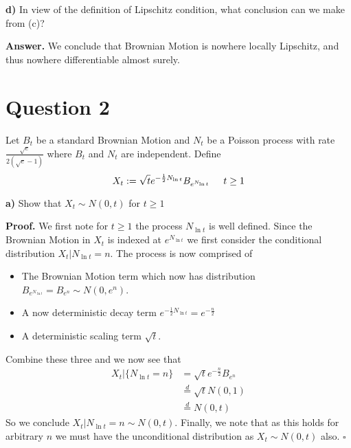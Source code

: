 \documentclass{article}
\begin{document}
\newpage
\begin{tcolorbox}
[colframe=black,colback=gray!5,boxrule=0.5pt]
 \textbf{d)} In view of the definition of Lipschitz condition, what conclusion can we make from (c)?
\end{tcolorbox}
\textbf{Answer.} We conclude that Brownian Motion is nowhere locally Lipschitz, and thus nowhere differentiable almost surely. 

\newpage
\section{Question 2}

\begin{tcolorbox}
[colframe=black,colback=gray!5,boxrule=0.5pt]
Let $B_t$ be a standard Brownian Motion and $N_t$ be a Poisson process with rate $\frac{\sqrt{e}}{2(\sqrt{e}- 1)}$ where $B_t$ and $N_t$ are independent. Define 
$$X_t := \sqrt{t} e^{-\frac{1}{2}N_{\ln t}} B_{e^{N_{\ln t}}} \hspace{5mm} t\geq 1$$
\end{tcolorbox}


\begin{tcolorbox}
[colframe=black,colback=gray!5,boxrule=0.5pt]
\textbf{a)} Show that $X_t \sim N(0,t)$ for $t\geq 1$
\end{tcolorbox}
\textbf{Proof.} We first note for $t\geq1$ the process $N_{\ln t}$ is well defined. Since the Brownian Motion in $X_t$ is indexed at $e^{N_{\ln t}}$ we first consider the conditional distribution $X_t | N_{\ln t} =n$. The process is now comprised of
\begin{itemize}
    \item The Brownian Motion term which now has distribution $B_{e^{N_{\ln t}}} = B_{e^n} \sim N(0, e^n)$. 
    \item A now deterministic decay term $e^{-\frac{1}{2}N_{\ln t}} = e^{-\frac{n}{2} }$
    \item A deterministic scaling term $\sqrt{t}$.
\end{itemize}
Combine these three and we now see that 
\begin{align*}
    X_t | \{N_{\ln t} = n\} &= \sqrt{t}e^{-\frac{n}{2}}B_{e^n} \\
    &\stackrel{d}{=} \sqrt{t} N(0,1) \\
    &\stackrel{d}{=} N(0,t)
\end{align*}
So we conclude $X_{t} | N_{\ln t}=n\sim N(0, t).$ Finally, we note that as this holds for arbitrary $n$ we must have the unconditional distribution as $X_t \sim N(0, t)$ also. $\square$
\end{document}
